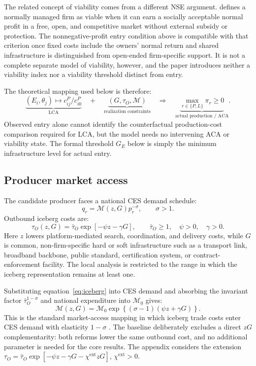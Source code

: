 \documentclass[11pt]{article}
\theoremstyle{definition}
\theoremstyle{remark}
\newcommand{\Mcal}{\mathcal M}
\begin{document}
The related concept of viability comes from a different NSE argument.
\citet{Lin2003} defines a normally managed firm as viable when it can earn a
socially acceptable normal profit in a free, open, and competitive market
without external subsidy or protection.  The nonnegative-profit entry
condition above is compatible with that criterion once fixed costs include
the owners' normal return and shared infrastructure is distinguished from
open-ended firm-specific support.  It is not a complete separate model of
viability, however, and the paper introduces neither a viability index nor a
viability threshold distinct from entry.

The theoretical mapping used below is therefore:
\[
\underbrace{(E_i,\theta_j)\longmapsto c^P_{ij}/c^P_{i0}}_{\mathrm{LCA}}
\quad+\quad
\underbrace{(G,\tau_O,\Mcal)}_{\text{realization constraints}}
\quad\Longrightarrow\quad
\underbrace{\max_{r\in\{P,L\}}\pi_r\geq0}_
{\text{actual production / ACA}}.
\]
Observed entry alone cannot identify the counterfactual production-cost
comparison required for LCA, but the model needs no intervening ACA or
viability state.  The formal threshold \(G_E\) below is simply the minimum
infrastructure level for actual entry.

\subsection{Producer market access}

The candidate producer faces a national CES demand schedule:
\begin{equation}
 q_r=\Mcal(z,G)p_r^{-\sigma},
 \qquad \sigma>1.
 \label{eq:producer_demand}
\end{equation}
Outbound iceberg costs are:
\begin{equation}
 \tau_O(z,G)=\bar\tau_O\exp[-\psi z-\gamma G],
 \qquad \bar\tau_O\geq1,\quad\psi>0,\quad\gamma>0.
 \label{eq:iceberg}
\end{equation}
Here \(z\) lowers platform-mediated search, coordination, and delivery costs,
while \(G\) is common, non-firm-specific hard or soft infrastructure such as a
transport link, broadband backbone, public standard, certification system, or
contract-enforcement facility.  The local analysis is restricted to the range
in which the iceberg representation remains at least one.

Substituting equation~\eqref{eq:iceberg} into CES demand and absorbing the
invariant factor \(\bar\tau_O^{1-\sigma}\) and national expenditure into
\(\Mcal_0\) gives:
\begin{equation}
 \Mcal(z,G)
 =
 \Mcal_0
 \exp\left\{
 (\sigma-1)(\psi z+\gamma G)
 \right\}.
 \label{eq:market_access}
\end{equation}
This is the standard market-access mapping in which iceberg trade costs enter
CES demand with elasticity \(1-\sigma\)
\citep{DonaldsonHornbeck2016}.  The baseline deliberately excludes a direct
\(zG\) complementarity: both reforms lower the same outbound cost, and no
additional parameter is needed for the core results.  The appendix considers
the extension
\(\tau_O=\bar\tau_O\exp[-\psi z-\gamma G-\chi^{\mathrm{ext}}zG]\),
\(\chi^{\mathrm{ext}}>0\).
\end{document}
